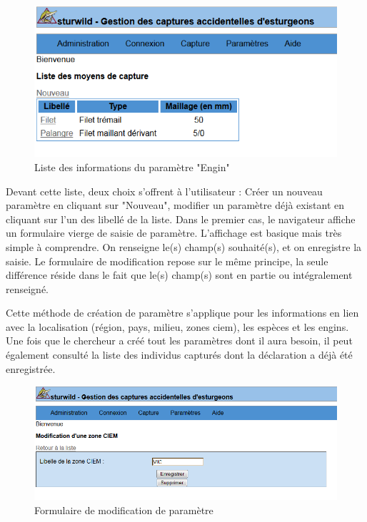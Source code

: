 \documentclass[12pt,a4paper,titlepage,twoside]{report}
\begin{document}
\begin{figure}[h]
\centering
\includegraphics[scale={0.8}]{pictures/paramList.png}
\caption{Liste des informations du paramètre "Engin"}
\end{figure}
\clearpage
Devant cette liste, deux choix s'offrent à l'utilisateur : Créer un nouveau paramètre en cliquant sur "Nouveau", modifier un paramètre déjà existant en cliquant sur l'un des libellé de la liste.
Dans le premier cas, le navigateur affiche un formulaire vierge de saisie de paramètre. L'affichage est basique mais très simple à comprendre. On renseigne le(s) champ(s) souhaité(s), et on enregistre la saisie. Le formulaire de modification repose sur le même principe, la seule différence réside dans le fait que le(s) champ(s) sont en partie ou intégralement renseigné.\newline

Cette méthode de création de paramètre s'applique pour les informations en lien avec la localisation (région, pays, milieu, zones ciem), les espèces et les engins. Une fois que le chercheur a créé tout les paramètres dont il aura besoin, il peut également consulté la liste des individus capturés dont la déclaration a déjà été enregistrée. 

\begin{figure}[h]
\centering
\includegraphics[width=\textwidth]{pictures/paramModif.png}
\caption{Formulaire de modification de paramètre}
\end{figure}
\end{document}
